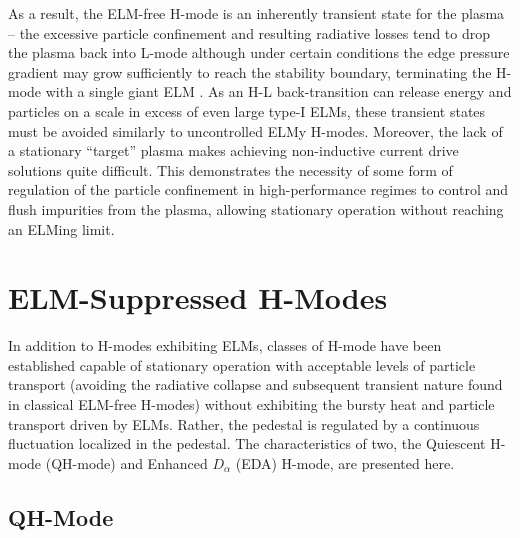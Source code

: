 As a result, the ELM-free H-mode is an inherently transient state for the plasma -- the excessive particle confinement and resulting radiative losses tend to drop the plasma back into L-mode although under certain conditions the edge pressure gradient may grow sufficiently to reach the stability boundary, terminating the H-mode with a single giant ELM \cite{Breger1998}.  As an H-L back-transition can release energy and particles on a scale in excess of even large type-I ELMs, these transient states must be avoided similarly to uncontrolled ELMy H-modes.  Moreover, the lack of a stationary ``target'' plasma makes achieving non-inductive current drive solutions quite difficult.  This demonstrates the necessity of some form of regulation of the particle confinement in high-performance regimes to control and flush impurities from the plasma, allowing stationary operation without reaching an ELMing limit.\nicesectionending

\section{ELM-Suppressed H-Modes}\label{sec:hcr_elmsuppressed}

In addition to H-modes exhibiting ELMs, classes of H-mode have been established capable of stationary operation with acceptable levels of particle transport (avoiding the radiative collapse and subsequent transient nature found in classical ELM-free H-modes) without exhibiting the bursty heat and particle transport driven by ELMs.  Rather, the pedestal is regulated by a continuous fluctuation localized in the pedestal.  The characteristics of two, the Quiescent H-mode (QH-mode) and Enhanced $D_\alpha$ (EDA) H-mode, are presented here.

\subsection{QH-Mode}\label{subsec:hcr_qh}

